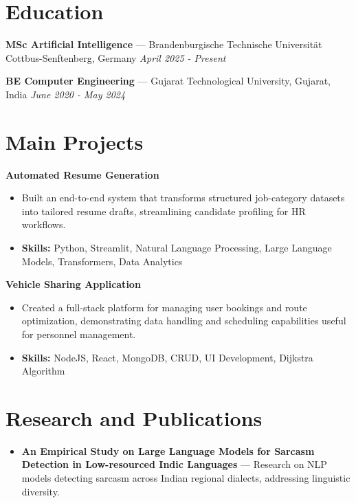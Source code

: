 \documentclass[a4paper,10pt]{article}
\begin{document}
\section*{Education}
\textbf{MSc Artificial Intelligence} — Brandenburgische Technische Universität Cottbus-Senftenberg, Germany \hfill \textit{April 2025 - Present}\par
\vspace{1.5pt}
\textbf{BE Computer Engineering} — Gujarat Technological University, Gujarat, India \hfill \textit{June 2020 - May 2024}\par

\section*{Main Projects}
\textbf{Automated Resume Generation}\par
\vspace{1pt}
\begin{itemize}
  \item Built an end-to-end system that transforms structured job-category datasets into tailored resume drafts, streamlining candidate profiling for HR workflows.
  \item \textbf{Skills:} Python, Streamlit, Natural Language Processing, Large Language Models, Transformers, Data Analytics
\end{itemize}
\vspace{3pt}
\textbf{Vehicle Sharing Application}\par
\vspace{1pt}
\begin{itemize}
  \item Created a full-stack platform for managing user bookings and route optimization, demonstrating data handling and scheduling capabilities useful for personnel management.
  \item \textbf{Skills:} NodeJS, React, MongoDB, CRUD, UI Development, Dijkstra Algorithm
\end{itemize}

\section*{Research and Publications}
\begin{itemize}
\item \textbf{An Empirical Study on Large Language Models for Sarcasm Detection in Low-resourced Indic Languages} — Research on NLP models detecting sarcasm across Indian regional dialects, addressing linguistic diversity.
\end{itemize}
\end{document}

